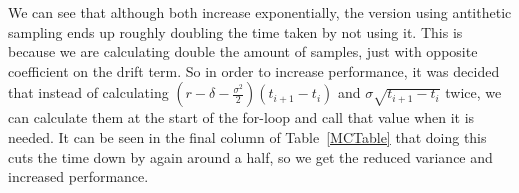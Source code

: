 \documentclass[11pt]{article}
\begin{document}
We can see that although both increase exponentially, the version using antithetic sampling ends up roughly 
doubling the time taken by not using it. This is because we are calculating double the amount of samples, just with 
opposite coefficient on the drift term. So in order to increase performance, it was decided that instead of 
calculating $(r-\delta-\frac{\sigma^2}{2})(t_{i+1}-t_i)$ and $\sigma\sqrt{t_{i+1}-t_i}$ twice, we can calculate them at 
the start of the for-loop and call that value when it is needed. It can be seen in the final column of Table~\ref{MCTable}
that doing this cuts the time down by again around a half, so we get the reduced variance and increased performance.
\end{document}

